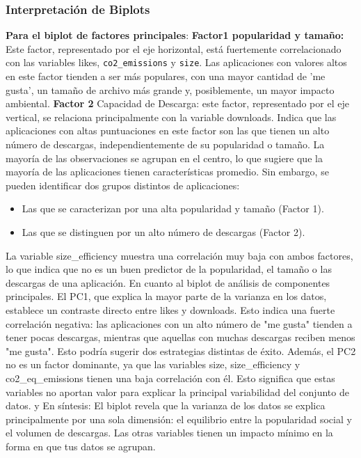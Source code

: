 \documentclass[journal]{IEEEtran}
\begin{document}
	\subsubsection{Interpretación de Biplots}
	\textbf{Para el biplot de factores principales}: \textbf{Factor1 popularidad y tamaño:} Este factor, representado por el eje horizontal, está fuertemente correlacionado con las variables likes, \texttt{co2\_emissions} y \texttt{size}. Las aplicaciones con valores altos en este factor tienden a ser más populares, con una mayor cantidad de 'me gusta', un tamaño de archivo más grande y, posiblemente, un mayor impacto ambiental.
	\textbf{Factor 2} Capacidad de Descarga: este factor, representado por el eje vertical, se relaciona principalmente con la variable downloads. Indica que las aplicaciones con altas puntuaciones en este factor son las que tienen un alto número de descargas, independientemente de su popularidad o tamaño.
	La mayoría de las observaciones se agrupan en el centro, lo que sugiere que la mayoría de las aplicaciones tienen características promedio. Sin embargo, se pueden identificar dos grupos distintos de aplicaciones:
	\begin{itemize}
		\item Las que se caracterizan por una alta popularidad y tamaño (Factor 1).
		\item Las que se distinguen por un alto número de descargas (Factor 2).
	\end{itemize}
	La variable size\_efficiency muestra una correlación muy baja con ambos factores, lo que indica que no es un buen predictor de la popularidad, el tamaño o las descargas de una aplicación.
	En cuanto al biplot de análisis de componentes principales. El PC1, que explica la mayor parte de la varianza en los datos, establece un contraste directo entre likes y downloads. Esto indica una fuerte correlación negativa: las aplicaciones con un alto número de "me gusta" tienden a tener pocas descargas, mientras que aquellas con muchas descargas reciben menos "me gusta". Esto podría sugerir dos estrategias distintas de éxito. Además, el PC2 no es un factor dominante, ya que las variables size, size\_efficiency y co2\_eq\_emissions tienen una baja correlación con él. Esto significa que estas variables no aportan valor para explicar la principal variabilidad del conjunto de datos. y En síntesis:
	El biplot revela que la varianza de los datos se explica principalmente por una sola dimensión: el equilibrio entre la popularidad social y el volumen de descargas. Las otras variables tienen un impacto mínimo en la forma en que tus datos se agrupan.
	
\end{document}
